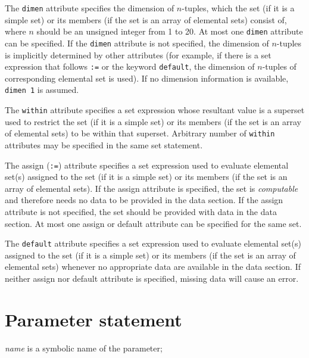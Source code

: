 \documentclass[11pt]{report}
\begin{document}
The {\tt dimen} attribute specifies the dimension of $n$-tuples, which
the set (if it is a simple set) or its members (if the set is an array
of elemental sets) consist of, where $n$ should be an unsigned integer
from 1 to 20. At most one {\tt dimen} attribute can be specified. If
the {\tt dimen} attribute is not specified, the dimension of $n$-tuples
is implicitly determined by other attributes (for example, if there is
a set expression that follows {\tt:=} or the keyword {\tt default}, the
dimension of $n$-tuples of corresponding elemental set is used).
If no dimension information is available, {\tt dimen 1} is assumed.

The {\tt within} attribute specifies a set expression whose resultant
value is a superset used to restrict the set (if it is a simple set) or
its members (if the set is an array of elemental sets) to be within
that superset. Arbitrary number of {\tt within} attributes may be
specified in the same set statement.

The assign ({\tt:=}) attribute specifies a set expression used to
evaluate elemental set(s) assigned to the set (if it is a simple set)
or its members (if the set is an array of elemental sets). If the
assign attribute is specified, the set is {\it computable} and
therefore needs no data to be provided in the data section. If the
assign attribute is not specified, the set should be provided with data
in the data section. At most one assign or default attribute can be
specified for the same set.

The {\tt default} attribute specifies a set expression used to evaluate
elemental set(s) assigned to the set (if it is a simple set) or its
members (if the set is an array of elemental sets) whenever
no appropriate data are available in the data section. If neither
assign nor default attribute is specified, missing data will cause an
error.

\newpage

\section{Parameter statement}

\noindent
{}

\medskip

\noindent
{\it name} is a symbolic name of the parameter;
\end{document}
